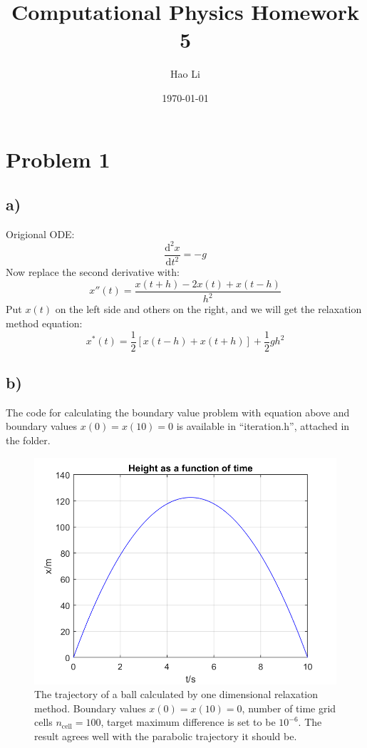 \documentclass[12pt, graphicx]{article}
\begin{document}
\title{Computational Physics Homework 5}
\author{Hao Li\footnotemark[2]}
\date{\today}


\maketitle

\section*{Problem 1}
\subsection*{a)}
Origional ODE:
\begin{equation}
\frac{\mathrm{d}^2x}{\mathrm{d}t^2}=-g
\end{equation}
Now replace the second derivative with:
\begin{equation}
x''(t)=\frac{x(t+h)-2x(t)+x(t-h)}{h^2}
\end{equation}
Put $x(t)$ on the left side and others on the right, and we will get the relaxation method equation:
\begin{equation}
x^*(t)=\frac{1}{2}[x(t-h)+x(t+h)]+\frac{1}{2}gh^2
\label{eq:rel1}
\end{equation}

\subsection*{b)}
The code for calculating the boundary value problem with equation above and boundary values $x(0)=x(10)=0$ is available in \textquotedblleft iteration.h\textquotedblright, attached in the folder.\par

\begin{figure}[ht]
\centering
\includegraphics[width = 120mm]{trajectory.png}
\caption{The trajectory of a ball calculated by one dimensional relaxation method. Boundary values $x(0)=x(10)=0$, number of time grid cells $n_\mathrm{cell}=100$, target maximum difference is set to be $10^{-6}$. The result agrees well with the parabolic trajectory it should be.}
\label{fig:trajectory}
\end{figure}
\end{document}
